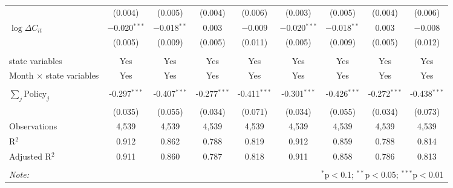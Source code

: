 \begin{tabular}{@{\extracolsep{1pt}}lcccccccc}
  & (0.004) & (0.005) & (0.004) & (0.006) & (0.003) & (0.005) & (0.004) & (0.006) \\ 
  $\log \Delta C_{it}$ & $-$0.020$^{***}$ & $-$0.018$^{**}$ & 0.003 & $-$0.009 & $-$0.020$^{***}$ & $-$0.018$^{**}$ & 0.003 & $-$0.008 \\ 
  & (0.005) & (0.009) & (0.005) & (0.011) & (0.005) & (0.009) & (0.005) & (0.012) \\ 
 \hline \\[-1.8ex] 
state variables & Yes & Yes & Yes & Yes & Yes & Yes & Yes & Yes \\ 
Month $\times$ state variables & Yes & Yes & Yes & Yes & Yes & Yes & Yes & Yes \\ 
\hline \\[-1.8ex] 
$\sum_j \mathrm{Policy}_j$ & -0.297$^{***}$ & -0.407$^{***}$ & -0.277$^{***}$ & -0.411$^{***}$ & -0.301$^{***}$ & -0.426$^{***}$ & -0.272$^{***}$ & -0.438$^{***}$ \\ 
 & (0.035) & (0.055) & (0.034) & (0.071) & (0.034) & (0.055) & (0.034) & (0.073) \\ 
Observations & 4,539 & 4,539 & 4,539 & 4,539 & 4,539 & 4,539 & 4,539 & 4,539 \\ 
R$^{2}$ & 0.912 & 0.862 & 0.788 & 0.819 & 0.912 & 0.859 & 0.788 & 0.814 \\ 
Adjusted R$^{2}$ & 0.911 & 0.860 & 0.787 & 0.818 & 0.911 & 0.858 & 0.786 & 0.813 \\ 
\hline 
\hline \\[-1.8ex] 
\textit{Note:}  & \multicolumn{8}{r}{$^{*}$p$<$0.1; $^{**}$p$<$0.05; $^{***}$p$<$0.01} \\ 
\end{tabular} 
